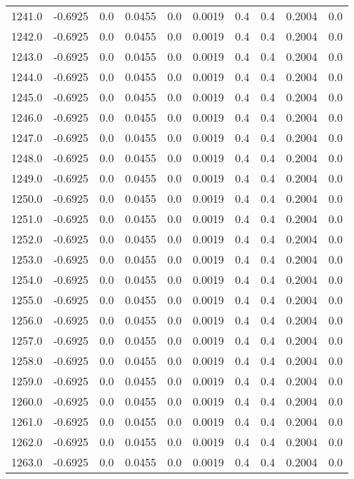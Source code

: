 \begin{longtable}{lrrrrrrrrr}
1241.0 & -0.6925 & 0.0 & 0.0455 & 0.0 & 0.0019 & 0.4 & 0.4 & 0.2004 & 0.0 \\
1242.0 & -0.6925 & 0.0 & 0.0455 & 0.0 & 0.0019 & 0.4 & 0.4 & 0.2004 & 0.0 \\
1243.0 & -0.6925 & 0.0 & 0.0455 & 0.0 & 0.0019 & 0.4 & 0.4 & 0.2004 & 0.0 \\
1244.0 & -0.6925 & 0.0 & 0.0455 & 0.0 & 0.0019 & 0.4 & 0.4 & 0.2004 & 0.0 \\
1245.0 & -0.6925 & 0.0 & 0.0455 & 0.0 & 0.0019 & 0.4 & 0.4 & 0.2004 & 0.0 \\
1246.0 & -0.6925 & 0.0 & 0.0455 & 0.0 & 0.0019 & 0.4 & 0.4 & 0.2004 & 0.0 \\
1247.0 & -0.6925 & 0.0 & 0.0455 & 0.0 & 0.0019 & 0.4 & 0.4 & 0.2004 & 0.0 \\
1248.0 & -0.6925 & 0.0 & 0.0455 & 0.0 & 0.0019 & 0.4 & 0.4 & 0.2004 & 0.0 \\
1249.0 & -0.6925 & 0.0 & 0.0455 & 0.0 & 0.0019 & 0.4 & 0.4 & 0.2004 & 0.0 \\
1250.0 & -0.6925 & 0.0 & 0.0455 & 0.0 & 0.0019 & 0.4 & 0.4 & 0.2004 & 0.0 \\
1251.0 & -0.6925 & 0.0 & 0.0455 & 0.0 & 0.0019 & 0.4 & 0.4 & 0.2004 & 0.0 \\
1252.0 & -0.6925 & 0.0 & 0.0455 & 0.0 & 0.0019 & 0.4 & 0.4 & 0.2004 & 0.0 \\
1253.0 & -0.6925 & 0.0 & 0.0455 & 0.0 & 0.0019 & 0.4 & 0.4 & 0.2004 & 0.0 \\
1254.0 & -0.6925 & 0.0 & 0.0455 & 0.0 & 0.0019 & 0.4 & 0.4 & 0.2004 & 0.0 \\
1255.0 & -0.6925 & 0.0 & 0.0455 & 0.0 & 0.0019 & 0.4 & 0.4 & 0.2004 & 0.0 \\
1256.0 & -0.6925 & 0.0 & 0.0455 & 0.0 & 0.0019 & 0.4 & 0.4 & 0.2004 & 0.0 \\
1257.0 & -0.6925 & 0.0 & 0.0455 & 0.0 & 0.0019 & 0.4 & 0.4 & 0.2004 & 0.0 \\
1258.0 & -0.6925 & 0.0 & 0.0455 & 0.0 & 0.0019 & 0.4 & 0.4 & 0.2004 & 0.0 \\
1259.0 & -0.6925 & 0.0 & 0.0455 & 0.0 & 0.0019 & 0.4 & 0.4 & 0.2004 & 0.0 \\
1260.0 & -0.6925 & 0.0 & 0.0455 & 0.0 & 0.0019 & 0.4 & 0.4 & 0.2004 & 0.0 \\
1261.0 & -0.6925 & 0.0 & 0.0455 & 0.0 & 0.0019 & 0.4 & 0.4 & 0.2004 & 0.0 \\
1262.0 & -0.6925 & 0.0 & 0.0455 & 0.0 & 0.0019 & 0.4 & 0.4 & 0.2004 & 0.0 \\
1263.0 & -0.6925 & 0.0 & 0.0455 & 0.0 & 0.0019 & 0.4 & 0.4 & 0.2004 & 0.0 \\

\end{longtable}
